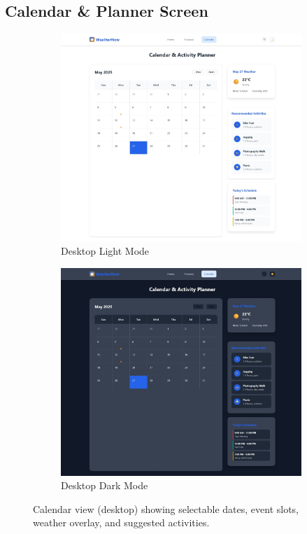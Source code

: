 \documentclass[11pt,a4paper]{article}
\begin{document}
\subsection{Calendar \& Planner Screen}
\FloatBarrier
\begin{figure}[H]
  \centering
  \begin{subfigure}{0.48\linewidth}
    \includegraphics[width=\linewidth]{calendar_lightmode.jpeg}
    \caption{Desktop Light Mode}
  \end{subfigure}\hfill
  \begin{subfigure}{0.48\linewidth}
    \includegraphics[width=\linewidth]{calendar_darkmode.jpeg}
    \caption{Desktop Dark Mode}
  \end{subfigure}
  \caption{Calendar view (desktop) showing selectable dates, event slots, weather overlay, and suggested activities.}
  \label{fig:calendar_desktop}
\end{figure}
\FloatBarrier
\end{document}
